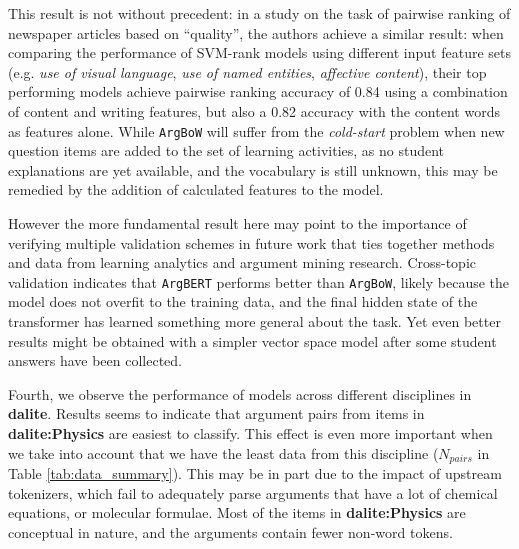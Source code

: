 \documentclass[runningheads]{llncs}
\begin{document}
This result is not without precedent: in a study on the task of pairwise 
ranking of newspaper articles based on ``quality'', the authors achieve a 
similar result: when comparing the performance of SVM-rank models using 
different input feature sets (e.g. \textit{use of visual language}, \textit{use 
of named entities}, \textit{affective content}), their top performing models 
achieve pairwise ranking accuracy of 0.84 using a combination of content and 
writing features, but also a 0.82 accuracy with the content words as features 
alone\cite{louis_what_2013}.
While \verb|ArgBoW| will suffer from the \textit{cold-start} problem when new 
question items are added to the set of learning activities, as no student 
explanations are yet available, and the vocabulary is still unknown, this may 
be remedied by the addition of calculated features to the model.

However the more fundamental result here may point to the importance of 
verifying multiple validation schemes in future work that ties together methods 
and data from learning analytics and argument mining research. 
Cross-topic validation indicates that \verb|ArgBERT| performs better than 
\verb|ArgBoW|, likely because the model does not overfit to the training data, 
and the final hidden state of the transformer has learned something more 
general about the task.
Yet even better results might be obtained with a simpler vector space model 
after some student answers have been collected.

Fourth, we observe the performance of models across different disciplines in 
\textbf{dalite}. 
Results seems to indicate that argument pairs from items in 
\textbf{dalite:Physics} are easiest to classify.
This effect is even more important when we take into account that we have the 
least data from this discipline ($N_{pairs}$ in Table \ref{tab:data_summary}).
This may be in part due to the impact of upstream tokenizers, which fail to 
adequately parse arguments that have a lot of chemical equations, or molecular 
formulae.
Most of the items in \textbf{dalite:Physics} are conceptual in nature, and the 
arguments contain fewer non-word tokens.
 
\end{document}
